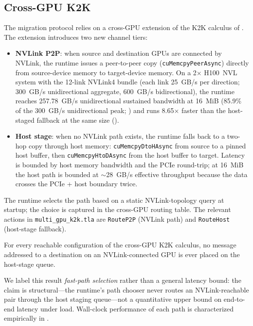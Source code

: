 \subsection{Cross-GPU K2K}
\label{sec:migration:cross-gpu}

The migration protocol relies on a cross-GPU extension of the K2K
calculus of .  The extension introduces two new
channel tiers:

\begin{itemize}
\item \textbf{NVLink P2P}: when source and destination GPUs are
connected by NVLink, the runtime issues a peer-to-peer copy
(\texttt{cuMemcpyPeerAsync}) directly from source-device memory to
target-device memory.  On a 2$\times$ H100~NVL system with the
12-link NVLink4 bundle (each link 25~GB/s per direction; 300~GB/s
unidirectional aggregate, 600~GB/s bidirectional), the runtime
reaches 257.78~GB/s unidirectional sustained bandwidth at 16~MiB
(85.9\% of the 300~GB/s unidirectional peak; )
and runs 8.65$\times$ faster than the host-staged fallback at the
same size ().

\item \textbf{Host stage}: when no NVLink path exists, the runtime
falls back to a two-hop copy through host memory:
\texttt{cuMemcpyDtoHAsync} from source to a pinned host buffer,
then \texttt{cuMemcpyHtoDAsync} from the host buffer to target.
Latency is bounded by host memory bandwidth and the PCIe
round-trip; at 16~MiB the host path is bounded at $\sim$28~GB/s
effective throughput because the data crosses the PCIe + host
boundary twice.
\end{itemize}

The runtime selects the path based on a static NVLink-topology
query at startup; the choice is captured in the cross-GPU routing
table.  The relevant \TLA{} actions in
\texttt{multi\_gpu\_k2k.tla} are \texttt{RouteP2P} (NVLink path)
and \texttt{RouteHost} (host-stage fallback).

\begin{theorem}
\label{thm:fast-path-selection}
For every reachable configuration of the cross-GPU K2K calculus, no
message addressed to a destination on an NVLink-connected GPU is
ever placed on the host-stage queue.
\end{theorem}

We label this result \emph{fast-path selection} rather than a
general latency bound: the claim is structural—the runtime's path
chooser never routes an NVLink-reachable pair through the host
staging queue—not a quantitative upper bound on end-to-end latency
under load.  Wall-clock performance of each path is characterized
empirically in .

